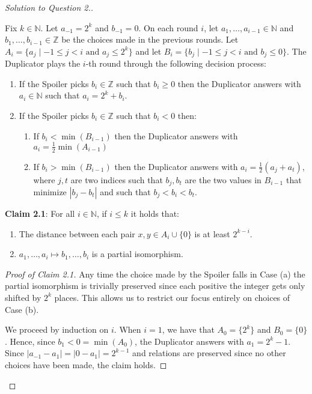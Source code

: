 \documentclass[12pt,a4paper]{report}
\theoremstyle{definition}
\newcommand{\abs}[1]{\left|#1\right|}
\newcommand{\N}{\mathbb{N}}                     %
\newcommand{\Z}{\mathbb{Z}}                     %
\begin{document}
\begin{proof}[Solution to Question 2.]
\begin{enumerate}
            Fix $k \in \N$. Let $a_{-1} = 2^k$ and $b_{-1} = 0$. On each round $i$, let $a_1, \ldots, a_{i-1} \in \N$ and $b_1, \ldots, b_{i-1} \in \Z$ be the choices made in the previous rounds. Let $A_i = \{a_j \mid -1 \leq j < i \text{ and } a_j \leq 2^k\}$ and let $B_i = \{b_j \mid -1 \leq j < i \text{ and } b_j \leq 0\}$. The Duplicator plays the $i$-th round through the following decision process:
            \begin{enumerate}
                \item If the Spoiler picks $b_i \in \Z$ such that $b_i \geq 0$ then the Duplicator answers with $a_i \in \N$ such that $a_i = 2^k + b_i$.
                \item If the Spoiler picks $b_i \in \Z$ such that $b_i < 0$ then:
                \begin{enumerate}
                    \item If $b_i < \min(B_{i-1})$ then the Duplicator answers with $a_i = \frac{1}{2} \min(A_{i-1})$
                    \item If $b_i > \min(B_{i-1})$ then the Duplicator answers with $a_i = \frac{1}{2}(a_j + a_t)$, where $j,t$ are two indices such that $b_j,b_t$ are the two values in $B_{i-1}$ that minimize $\abs{b_j - b_t}$ and such that $b_j < b_i < b_t$.
                \end{enumerate}
            \end{enumerate}

            \textbf{Claim 2.1}: For all $i \in \N$, if $i \leq k$ it holds that:
            \begin{enumerate}
                \item The distance between each pair $x,y \in A_i \cup \{0\}$ is at least $2^{k-i}$.
                \item $a_1, \ldots, a_i \mapsto b_1, \ldots, b_i$ is a partial isomorphism.
            \end{enumerate}

            \begin{proof}[Proof of Claim 2.1]
                Any time the choice made by the Spoiler falls in Case (a) the partial isomorphism is trivially preserved since each positive the integer gets only shifted by $2^k$ places. This allows us to restrict our focus entirely on choices of Case (b).
                
                We proceed by induction on $i$. When $i = 1$, we have that $A_0 = \{2^k\}$ and $B_0 = \{0\}$. Hence, since $b_1 < 0 = \min(A_0)$, the Duplicator answers with $a_1 = 2^k-1$. Since $\abs{a_{-1} - a_1} = \abs{0 - a_1} = 2^{k-1}$ and relations are preserved since no other choices have been made, the claim holds.
                

\end{proof}
\end{enumerate}
\end{proof}
\end{document}
